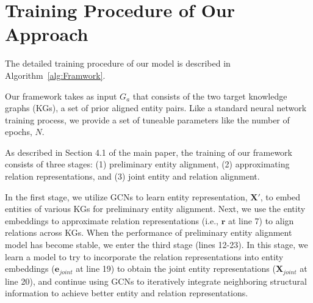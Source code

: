 \documentclass[11pt,a4paper]{article}
\begin{document}



\appendix
\section{Training Procedure of Our Approach}
\label{sec:appendix}

The detailed training procedure of our model is described in Algorithm~\ref{alg:Framwork}. 


Our framework takes as input $G_a$ that consists of the two target knowledge graphs (KGs), a set of prior aligned entity pairs. Like a standard neural network training process, we provide a set of tuneable parameters like the number of epochs, $N$. 

As described in Section 4.1 of the main paper, the training of our framework consists of three stages: (1) preliminary entity alignment, (2) approximating relation representations, and (3) joint entity and relation alignment. 

In the first stage, we utilize GCNs to learn entity representation, $\textbf{X}'$, to embed entities of various KGs for preliminary entity alignment.
Next, we use the entity embeddings to
approximate relation representations (i.e., $\bm{r}$ at line 7) to align relations across KGs. When the performance of preliminary entity alignment model has become stable, we enter the third stage (lines 12-23). In this stage, we learn a model to try to incorporate the relation representations into entity embeddings ($\bm{e}_{joint}$ at line 19) to obtain the joint entity representations ($\textbf{X}_{joint}$ at line 20), and continue using GCNs to iteratively integrate neighboring structural information to achieve better entity and relation representations.
\end{document}
